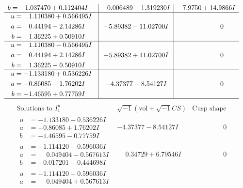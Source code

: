 \documentclass[1p]{elsarticle_modified}
\theoremstyle{definition}
\newcommand{\I}{\sqrt{-1}}
\begin{document}
$$\begin{array}{c|c|c}
\begin{aligned}
b &= -1.037470 + 0.112404 I\end{aligned}
 & -0.006489 + 1.319230 I & \phantom{-}7.9750 + 14.9866 I \\ \hline\begin{aligned}
u &= \phantom{-}1.110380 + 0.566495 I \\
a &= \phantom{-}0.44194 - 2.14286 I \\
b &= \phantom{-}1.36225 + 0.50910 I\end{aligned}
 & -5.89382 - 11.02700 I & \phantom{-0.000000 } 0 \\ \hline\begin{aligned}
u &= \phantom{-}1.110380 - 0.566495 I \\
a &= \phantom{-}0.44194 + 2.14286 I \\
b &= \phantom{-}1.36225 - 0.50910 I\end{aligned}
 & -5.89382 + 11.02700 I & \phantom{-0.000000 } 0 \\ \hline\begin{aligned}
u &= -1.133180 + 0.536226 I \\
a &= -0.86085 - 1.76202 I \\
b &= -1.46595 + 0.77759 I\end{aligned}
 & -4.37377 + 8.54127 I & \phantom{-0.000000 } 0\\
 \hline 
 \end{array}$$\newpage$$\begin{array}{c|c|c}  
\text{Solutions to }I^u_{1}& \I (\text{vol} + \sqrt{-1}CS) & \text{Cusp shape}\\
 \hline 
\begin{aligned}
u &= -1.133180 - 0.536226 I \\
a &= -0.86085 + 1.76202 I \\
b &= -1.46595 - 0.77759 I\end{aligned}
 & -4.37377 - 8.54127 I & \phantom{-0.000000 } 0 \\ \hline\begin{aligned}
u &= -1.114120 + 0.596036 I \\
a &= \phantom{-}0.049404 - 0.567613 I \\
b &= -0.017201 + 0.444698 I\end{aligned}
 & \phantom{-}0.34729 + 6.79546 I & \phantom{-0.000000 } 0 \\ \hline\begin{aligned}
u &= -1.114120 - 0.596036 I \\
a &= \phantom{-}0.049404 + 0.567613 I \\

\end{aligned}
\end{array}$$
\end{document}
